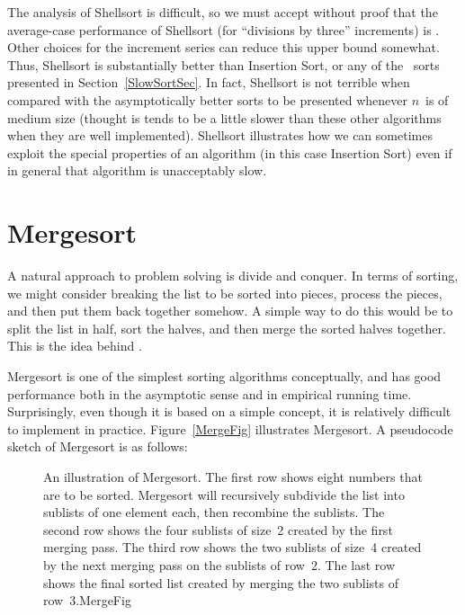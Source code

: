 The analysis of Shellsort is difficult, so we must
accept without proof that the average-case performance
of Shellsort (for ``divisions by three'' increments) is \Onsqrtn.
Other choices for the increment series can reduce this upper bound
somewhat.
Thus, Shellsort is substantially better than Insertion Sort, or any
of the \Thetantwo\ sorts presented in Section~\ref{SlowSortSec}.
In fact, Shellsort is not terrible when compared with the
asymptotically better sorts to be presented whenever \(n\)~is of
medium size (thought is tends to be a little slower than these other
algorithms when they are well implemented). 
Shellsort illustrates how we can sometimes exploit the special
properties of an algorithm (in this case Insertion Sort) even if in
general that algorithm is unacceptably
slow.

\section{Mergesort}
\label{MergeSort}

A natural approach to problem solving is divide and conquer.
In terms of sorting, we might consider breaking the list to be sorted
into pieces, process the pieces, and then put them back together
somehow.
A simple way to do this would be to split the list in half, sort
the halves, and then merge the sorted halves together.
This is the idea behind .

Mergesort is one of the simplest sorting algorithms conceptually,
and has good performance both in the asymptotic 
sense and in empirical running time.
Surprisingly, even though it is based on a simple concept,
it is relatively difficult to implement in practice.
Figure~\ref{MergeFig} illustrates Mergesort.
A pseudocode sketch of Mergesort is as follows:


\begin{figure}
\vspace{-1pt}

{An illustration of Mergesort.
The first row shows eight numbers that are to be sorted.
Mergesort will recursively subdivide the list into
sublists of one element each, then recombine the sublists.
The second row shows the four sublists of size~2 created by the
first merging pass.
The third row shows the two sublists of size~4 created by the next
merging pass on the sublists of row~2.
The last row shows the final sorted list created by merging the two
sublists of row~3.}{MergeFig}
\bigskip
\end{figure}

